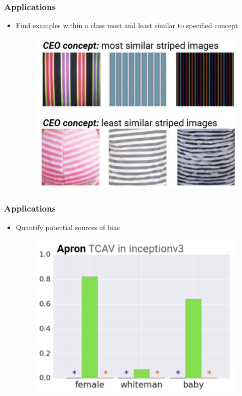 \documentclass[10pt,mathserif]{beamer}
\begin{document}
\begin{frame}
  \frametitle{Applications}
  \begin{itemize}
  \item Find examples within a class most and least similar to specified concept
    \begin{figure}[ht]
      \centering
      \includegraphics[width=0.7\paperwidth]{figure/cav_app3}
    \end{figure}
  \end{itemize}  
\end{frame}

\begin{frame}
  \frametitle{Applications}
  \begin{itemize}
  \item Quantify potential sources of bias
    \begin{figure}[ht]
      \centering
      \includegraphics[width=0.7\paperwidth]{figure/cav_app2}
    \end{figure}
  \end{itemize}  
\end{frame}
\end{document}
